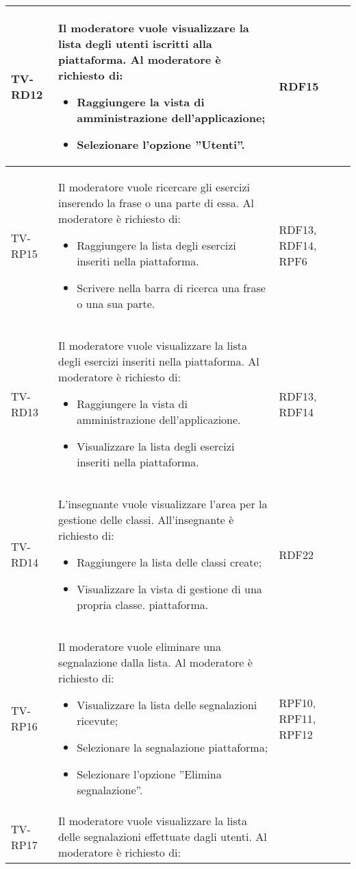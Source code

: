 \begin{longtable}{|>{\centering\arraybackslash}m{1.6cm}|>{\centering\arraybackslash}m{6.41cm}|>{\centering\arraybackslash}m{3.1cm} | >{\centering\arraybackslash}m{2.6cm}|}
		  \rowcolor{LightGray}
TV-RD12 & Il moderatore vuole visualizzare la lista degli utenti iscritti alla piattaforma. Al moderatore è richiesto di:
\begin{itemize}
 \item Raggiungere la vista di amministrazione dell’applicazione;
 \item Selezionare l’opzione ”Utenti”.
\end{itemize}  & RDF15 \\ \hline

TV-RP15 & Il moderatore vuole ricercare gli esercizi inserendo la frase o una parte di essa. Al moderatore è richiesto di:

\begin{itemize}
 \item Raggiungere la lista degli esercizi inseriti nella piattaforma.
 \item Scrivere nella barra di ricerca una frase o una sua parte.
\end{itemize}  & RDF13, RDF14, RPF6 \\ \hline

		  \rowcolor{LightGray}
TV-RD13 & Il moderatore vuole visualizzare la lista degli esercizi inseriti nella piattaforma. Al moderatore è richiesto di:

\begin{itemize}
 \item Raggiungere la vista di amministrazione dell’applicazione.
 \item Visualizzare la lista degli esercizi inseriti nella piattaforma.
\end{itemize}  & RDF13, RDF14 \\ \hline

TV-RD14 & L’insegnante vuole visualizzare l’area per la gestione delle classi. All'insegnante è richiesto di:

\begin{itemize}
 \item Raggiungere la lista delle classi create;
 \item Visualizzare la vista di gestione di una propria classe. piattaforma.
\end{itemize}  & RDF22 \\ \hline

		  \rowcolor{LightGray}
TV-RP16 & Il moderatore vuole eliminare una segnalazione dalla lista. Al moderatore è richiesto di:

\begin{itemize}
 \item Visualizzare la lista delle segnalazioni ricevute;
 \item Selezionare la segnalazione piattaforma;
 \item Selezionare l’opzione ”Elimina segnalazione”.
\end{itemize}  & RPF10, RPF11, RPF12 \\ \hline
TV-RP17 & Il moderatore vuole visualizzare la lista delle segnalazioni effettuate dagli utenti. Al moderatore è richiesto di:


\end{longtable}
